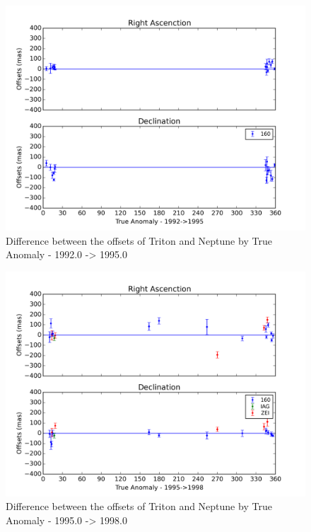\documentclass[12pt,a4paper]{report}
\begin{document}
\begin{figure}
\includegraphics[width=14.0cm]{Anom_TN_1992-1995.png} 
\caption{Difference between the offsets of Triton and Neptune by True Anomaly - 1992.0 -> 1995.0}
\label{Fig:triton-netuno-1992}
\end{figure}
\begin{figure}
\includegraphics[width=14.0cm]{Anom_TN_1995-1998.png} 
\caption{Difference between the offsets of Triton and Neptune by True Anomaly - 1995.0 -> 1998.0}
\label{Fig:triton-netuno-1995}
\end{figure}
\end{document}
